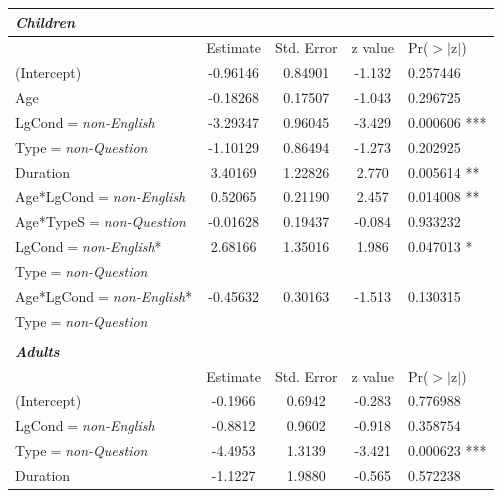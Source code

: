 \documentclass[authoryear, 12pt]{elsarticle}
\begin{document}
\begin{table}[h!]
\begin{small}
\begin{center}
  \begin{tabular}{lcccl}
  \textbf{\textit{Children}} &&&& \\
    \hline
                   & Estimate & Std. Error & z value & Pr($>$$|$z$|$)    \\
    \hline
    (Intercept)   &      -0.96146 &   0.84901 & -1.132 & 0.257446 \\    
    Age             &    -0.18268 &   0.17507 & -1.043 & 0.296725   \\  
    LgCond$=$\textit{non-English} &          -3.29347 &   0.96045 & -3.429 & 0.000606 *** \\
    Type$=$\textit{non-Question}          &     -1.10129 &   0.86494 & -1.273 & 0.202925     \\
    Duration      &       3.40169 &   1.22826 &  2.770 & 0.005614  **\\
    Age*LgCond$=$\textit{non-English} &       0.52065 &   0.21190 &  2.457 & 0.014008 ** \\  
    Age*TypeS$=$\textit{non-Question}          & -0.01628 &   0.19437 & -0.084 & 0.933232     \\
    LgCond$=$\textit{non-English}* &     2.68166 &   1.35016 &  1.986 & 0.047013 * \\
    \hspace*{5mm} Type$=$\textit{non-Question} &&&& \\
    Age*LgCond$=$\textit{non-English}* & -0.45632 &   0.30163 & -1.513 & 0.130315  \\
    \hspace*{5mm} Type$=$\textit{non-Question} &&&& \\
    \hline
  &&&& \\
  \textbf{\textit{Adults}} &&&& \\
    \hline
                       &  Estimate & Std. Error & z value & Pr($>$$|$z$|$) \\    
    \hline
    (Intercept)       &        -0.1966 &    0.6942 & -0.283 & 0.776988     \\
    LgCond$=$\textit{non-English}    &             -0.8812 &    0.9602 & -0.918 & 0.358754   \\  
    Type$=$\textit{non-Question}             &        -4.4953 &    1.3139 & -3.421 & 0.000623 *** \\
    Duration          &        -1.1227 &    1.9880 & -0.565 & 0.572238     \\

\end{tabular}
\end{center}
\end{small}
\end{table}
\end{document}
